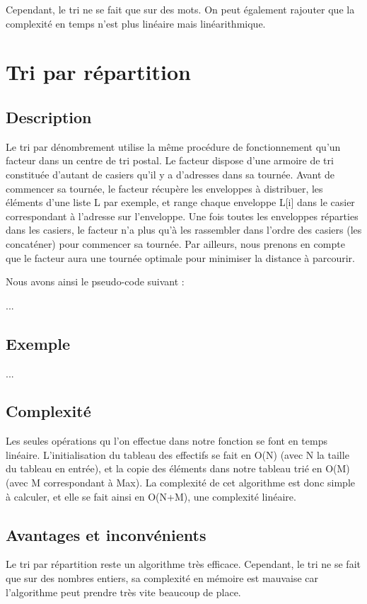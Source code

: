 \documentclass[12pt]{article}
\begin{document}
Cependant, le tri ne se fait que sur des mots. On peut également rajouter que la complexité en temps n'est plus linéaire mais linéarithmique. 

\newpage



\section{Tri par répartition}
\subsection{Description}

\hspace{1.0 cm} Le tri par dénombrement utilise la même procédure de fonctionnement qu’un facteur dans un centre de tri postal. Le facteur dispose d'une armoire de tri constituée d'autant de casiers qu'il y a d'adresses dans sa tournée.
Avant de commencer sa tournée, le facteur récupère les enveloppes à distribuer, les éléments d’une liste L par exemple, et range chaque enveloppe L[i] dans le casier correspondant à l'adresse sur l'enveloppe. Une fois toutes les enveloppes réparties dans les casiers, le facteur n'a plus qu'à les rassembler dans l'ordre des casiers (les concaténer) pour commencer sa tournée. Par ailleurs, nous prenons en compte que le facteur aura une tournée optimale pour minimiser la distance à parcourir.

Nous avons ainsi le pseudo-code suivant :

...

\subsection{Exemple}
...

\subsection{Complexité}
\hspace{1.0 cm} Les seules opérations qu l'on effectue dans notre fonction se font en temps linéaire. L'initialisation du tableau des effectifs se fait en O(N) (avec N la taille du tableau en entrée), et la copie des éléments dans notre tableau trié en O(M) (avec M correspondant à Max). La complexité de cet algorithme est donc simple à calculer, et elle se fait ainsi en O(N+M), une complexité linéaire. 

\subsection{Avantages et inconvénients}
\hspace{1.0 cm} Le tri par répartition reste un algorithme très efficace. Cependant, le tri ne se fait que sur des nombres entiers, sa complexité en mémoire est mauvaise car l'algorithme peut prendre très vite beaucoup de place. 
\end{document}
